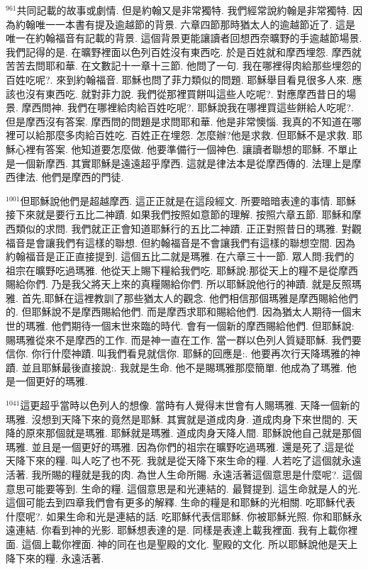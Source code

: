 \documentclass{book}
\begin{document}
$^{961}$共同記載的故事或劇情.
但是約翰又是非常獨特.
我們經常說約翰是非常獨特.
因為約翰唯一一本書有提及逾越節的背景.
六章四節那時猶太人的逾越節近了.
這是唯一在約翰福音有記載的背景.
這個背景更能讓讀者回想西奈曠野的手逾越節場景.
我們記得的是.
在曠野裡面以色列百姓沒有東西吃.
於是百姓就和摩西埋怨.
摩西就苦苦去問耶和華.
在文數記十一章十三節.
他問了一句.
我在哪裡得肉給那些埋怨的百姓吃呢?.
來到約翰福音.
耶穌也問了菲力類似的問題.
耶穌舉目看見很多人來.
應該也沒有東西吃.
就對菲力說.
我們從那裡買餅叫這些人吃呢?.
對應摩西昔日的場景.
摩西問神.
我們在哪裡給肉給百姓吃呢?.
耶穌說我在哪裡買這些餅給人吃呢?.
但是摩西沒有答案.
摩西問的問題是求問耶和華.
他是非常懊惱.
我真的不知道在哪裡可以給那麼多肉給百姓吃.
百姓正在埋怨.
怎麼辦?他是求救.
但耶穌不是求救.
耶穌心裡有答案.
他知道要怎麼做.
他要準備行一個神色.
讓讀者聯想的耶穌.
不單止是一個新摩西.
其實耶穌是遠遠超乎摩西.
這就是律法本是從摩西傳的.
法理上是摩西律法.
他們是摩西的門徒.

$^{1001}$但耶穌說他們是超越摩西.
這正正就是在這段經文.
所要暗暗表達的事情.
耶穌接下來就是要行五比二神蹟.
如果我們按照如意節的理解.
按照六章五節.
耶穌和摩西類似的求問.
我們就正正會知道耶穌行的五比二神蹟.
正正對照昔日的瑪雅.
對觀福音是會讓我們有這樣的聯想.
但約翰福音是不會讓我們有這樣的聯想空間.
因為約翰福音是正正直接提到.
這個五比二就是瑪雅.
在六章三十一節.
眾人問:我們的祖宗在曠野吃過瑪雅.
他從天上賜下糧給我們吃.
耶穌說:那從天上的糧不是從摩西賜給你們.
乃是我父將天上來的真糧賜給你們.
所以耶穌說他行的神蹟.
就是反照瑪雅.
首先,耶穌在這裡教訓了那些猶太人的觀念.
他們相信那個瑪雅是摩西賜給他們的.
但耶穌說不是摩西賜給他們.
而是摩西求耶和賜給他們.
因為猶太人期待一個末世的瑪雅.
他們期待一個末世來臨的時代.
會有一個新的摩西賜給他們.
但耶穌說:賜瑪雅從來不是摩西的工作.
而是神一直在工作.
當一群以色列人質疑耶穌.
我們要信你.
你行什麼神蹟.
叫我們看見就信你.
耶穌的回應是:.
他要再次行天降瑪雅的神蹟.
並且耶穌最後直接說:.
我就是生命.
他不是賜瑪雅那麼簡單.
他成為了瑪雅.
他是一個更好的瑪雅.

$^{1041}$這更超乎當時以色列人的想像.
當時有人覺得末世會有人賜瑪雅.
天降一個新的瑪雅.
沒想到天降下來的竟然是耶穌.
其實就是道成肉身.
道成肉身下來世間的.
天降的原來那個就是瑪雅.
耶穌就是瑪雅.
道成肉身天降人間.
耶穌說他自己就是那個瑪雅.
並且是一個更好的瑪雅.
因為你們的祖宗在曠野吃過瑪雅.
還是死了,這是從天降下來的糧.
叫人吃了也不死.
我就是從天降下來生命的糧.
人若吃了這個就永遠活著.
我所賜的糧就是我的肉.
為世人生命所賜.
永遠活著這個意思是什麼呢?.
這個意思可能要等到.
生命的糧.
這個意思是和光連結的.
最賢提到.
這生命就是人的光.
這個可能去到四章我們會有更多的解釋.
生命的糧是和耶穌的光相關.
吃耶穌代表什麼呢?.
如果生命和光是連結的話.
吃耶穌代表信耶穌.
你被耶穌光照.
你和耶穌永遠連結.
你看到神的光影.
耶穌想表達的是.
同樣是表達上載我裡面.
我有上載你裡面.
這個上載你裡面.
神的同在也是聖殿的文化.
聖殿的文化.
所以耶穌說他是天上降下來的糧.
永遠活著.
\end{document}
